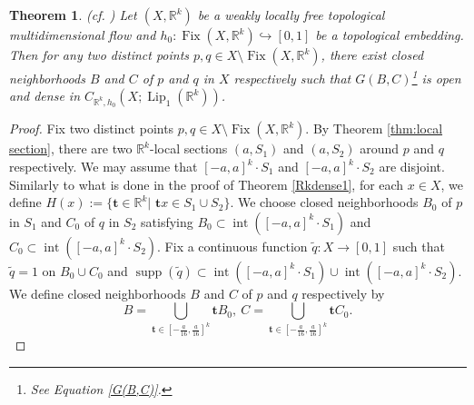 \documentclass[11pt]{article}
\theoremstyle{plain}
\newtheorem{thm}{Theorem}[section]
\theoremstyle{definition}
\DeclareMathOperator{\Lip}{Lip}
\DeclareMathOperator{\Fix}{Fix}
\DeclareMathOperator{\Int}{int}
\DeclareMathOperator{\supp}{supp}
\def\Rk{\mathbb{R}^k}
\def\tt{\mathbf t}
\numberwithin{figure}{section}
\begin{document}
\begin{thm}\label{Rkdense2}(cf. \cite[Lemma 3.4]{GJT19})
Let $(X,\Rk)$ be a weakly locally free topological multidimensional flow and  $h_0:\Fix(X,\Rk)\hookrightarrow[0,1]$ be a topological  embedding. Then for any two distinct points $p,q\in X\setminus\Fix(X,\Rk)$, there exist closed neighborhoods $B$ and $C$ of $p$ and $q$ in $X$ respectively such that $G(B,C)$\footnote{See Equation \eqref{G(B,C)}.}
is open and dense in $C_{\Rk,h_0}(X;\Lip_{1}(\Rk))$.
\end{thm}
\begin{proof}
    Fix two distinct points $p,q\in X\setminus\Fix(X,\Rk)$. By Theorem \ref{thm:local section}, there are two $\Rk$-local sections $(a,S_1)$ and $(a,S_2)$ around $p$ and $q$ respectively. We may assume that $[-a,a]^k\cdot S_1$ and $[-a,a]^k\cdot S_2$ are disjoint. 
    Similarly to what is done in the proof of Theorem \ref{Rkdense1},  for each $x\in X$, we define $H(x):=\{\mathbf t\in\Rk|\,\, \tt x\in S_1\cup S_2\}$. 
    We choose closed neighborhoods $B_0$ of $p$ in $S_1$ and $C_0$ of $q$ in $S_2$ satisfying $B_0\subset\Int([-a,a]^k\cdot S_1)$ and $C_0\subset\Int([-a,a]^k\cdot S_2)$. 
    Fix a continuous function $\widetilde{q}:X\to[0,1]$ such that $\widetilde{q}=1$ on $B_0\cup C_0$ and $\supp(\widetilde{q})\subset\Int([-a,a]^k\cdot S_1)\cup\Int([-a,a]^k\cdot S_2)$.
    We define closed neighborhoods $B$ and $C$ of $p$ and $q$ respectively by
    \begin{equation*}
        B=\bigcup\limits_{\mathbf t\in[-\frac{a}{16},\frac{a}{16}]^k}\tt B_0
        ,~C=\bigcup\limits_{\mathbf t\in[-\frac{a}{16},\frac{a}{16}]^k}\tt C_0.
    \end{equation*}
     

\end{proof}
\end{document}
